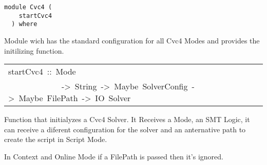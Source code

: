 \label{module:Cvc4}
\haddockbeginheader
{\haddockverb\begin{verbatim}
module Cvc4 (
    startCvc4
  ) where\end{verbatim}}
\haddockendheader

Module wich has the standard configuration for all Cvc4 Modes and
  provides the initilizing function.
\par

\begin{haddockdesc}
\item[\begin{tabular}{@{}l}
startCvc4\ ::\ Mode\\\ \ \ \ \ \ \ \ \ \ \ \ \ ->\ String\ ->\ Maybe\ SolverConfig\ ->\ Maybe\ FilePath\ ->\ IO\ Solver
\end{tabular}]\haddockbegindoc
Function that initialyzes a Cvc4 Solver.
  It Receives a Mode, an SMT Logic, it can receive a diferent configuration
  for the solver and an anternative path to create the script in Script Mode.
\par
In Context and Online Mode if a FilePath is passed then it's ignored.
\par

\end{haddockdesc}